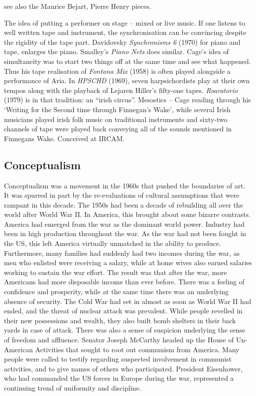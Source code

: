 see also the Maurice Bejart, Pierre Henry pieces.

The idea of putting a performer on stage – mixed or live music.  If one listens to well written tape and instrument, the synchronisation can be convincing despite the rigidity of the tape part.  Davidovsky \textit{Synchronisms 6} (1970) for piano and tape, enlarges the piano. Smalley's \textit{Piano Nets} does similar.  Cage's idea of simultaneity was to start two things off at the same time and see what happened. Thus his tape realisation of \textit{Fontana Mix} (1958) is often played alongside a performance of Aria. In \textit{HPSCHD} (1969), seven harpsichordists play at their own tempos along with the playback of Lejaren Hiller's fifty-one tapes.  \textit{Roaratorio} (1979) is in that tradition: an ``irish circus''. Mesostics – Cage reading through his `Writing for the Second time through Finnegan's Wake', while several Irish musicians played irish folk music on traditional instruments and sixty-two channels of tape were played back conveying all of the sounds mentioned in Finnegans Wake. Conceived at IRCAM. 

\subsection{Conceptualism}
Conceptualism was a movement in the 1960s that pushed the boundaries of art. It was spurred in part by the re-evaluations of cultural assumptions that were rampant in this decade. The 1950s had been a decade of rebuilding all over the world after World War II. In America, this brought about some bizarre contrasts. America had emerged from the war as the dominant world power. Industry had been in high production throughout the war. As the war had not been fought in the US, this left America virtually unmatched in the ability to produce. Furthermore, many families had suddenly had two incomes during the war, as men who enlisted were receiving a salary, while at home wives also earned salaries working to sustain the war effort. The result was that after the war, more Americans had more disposable income than ever before. There was a feeling of confidence and prosperity, while at the same time there was an underlying absence of security. The Cold War had set in almost as soon as World War II had ended, and the threat of nuclear attack was prevalent. While people revelled in their new possessions and wealth, they also built bomb shelters in their back yards in case of attack. There was also a sense of suspicion underlying the sense of freedom and affluence. Senator Joseph McCarthy headed up the House of Un-American Activities that sought to root out communism from America. Many people were called to testify regarding suspected involvement in communist activities, and to give names of others who participated. President Eisenhower, who had commanded the US forces in Europe during the war, represented a continuing trend of uniformity and discipline.


